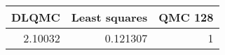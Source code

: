 \begin{tabular}{rrr}
\toprule
   DLQMC &   Least squares &   QMC 128 \\
\midrule
 2.10032 &        0.121307 &         1 \\
\bottomrule
\end{tabular}
